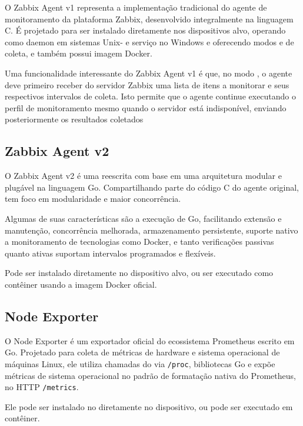 O Zabbix Agent v1 \citep{zabbix2025} representa a implementação tradicional do agente de monitoramento da plataforma Zabbix, desenvolvido integralmente na linguagem C. É projetado para ser instalado diretamente nos dispositivos alvo, operando como daemon em sistemas Unix- e serviço no Windows e oferecendo modos  e  de coleta, e também possui imagem Docker.

Uma funcionalidade interessante do Zabbix Agent v1 é que, no modo , o agente deve primeiro receber do servidor Zabbix uma lista de itens a monitorar e seus respectivos intervalos de coleta. Isto permite que o agente continue executando o perfil de monitoramento mesmo quando o servidor está indisponível, enviando posteriormente os resultados coletados

\subsection{Zabbix Agent v2}
\label{subsection:ZabbixAgentV2}

O Zabbix Agent v2 \citep{zabbix2025} é uma reescrita com base em uma arquitetura modular e plugável na linguagem Go. Compartilhando parte do código C do agente original, tem foco em modularidade e maior concorrência.

Algumas de suas características são a execução de  Go, facilitando extensão e manutenção, concorrência melhorada, armazenamento persistente, suporte nativo a monitoramento de tecnologias como Docker, e tanto verificações passivas quanto ativas suportam intervalos programados e flexíveis.

Pode ser instalado diretamente no dispositivo alvo, ou ser executado como contêiner usando a imagem Docker oficial.

\subsection{Node Exporter}
\label{subsection:NodeExporter}

O Node Exporter \citep{nodeexporter2025} é um exportador oficial do ecossistema Prometheus escrito em Go. Projetado para coleta de métricas de hardware e sistema operacional de máquinas Linux, ele utiliza chamadas do  via \verb|/proc|, bibliotecas Go e expõe métricas de sistema operacional no padrão de formatação nativa do Prometheus, no  HTTP \verb|/metrics|.

Ele pode ser instalado no diretamente no dispositivo, ou pode ser executado em contêiner. 

